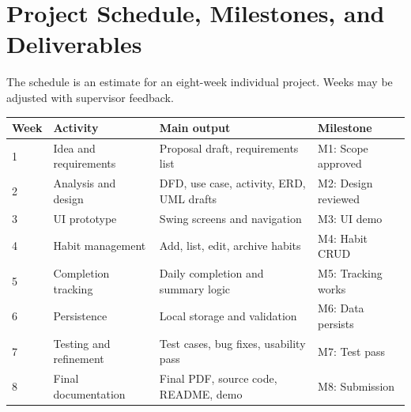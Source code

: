 \documentclass[11pt,a4paper]{article}
\begin{document}
\begin{center}
\end{center}

\section{Project Schedule, Milestones, and Deliverables}
The schedule is an estimate for an eight-week individual project. Weeks may be adjusted with supervisor feedback.
\begin{tabularx}{\linewidth}{p{1.1cm}p{2.4cm}X p{2.3cm}}
\toprule
Week & Activity & Main output & Milestone\\ \midrule
1 & Idea and requirements & Proposal draft, requirements list & M1: Scope approved\\
2 & Analysis and design & DFD, use case, activity, ERD, UML drafts & M2: Design reviewed\\
3 & UI prototype & Swing screens and navigation & M3: UI demo\\
4 & Habit management & Add, list, edit, archive habits & M4: Habit CRUD\\
5 & Completion tracking & Daily completion and summary logic & M5: Tracking works\\
6 & Persistence & Local storage and validation & M6: Data persists\\
7 & Testing and refinement & Test cases, bug fixes, usability pass & M7: Test pass\\
8 & Final documentation & Final PDF, source code, README, demo & M8: Submission\\
\bottomrule
\end{tabularx}
\end{document}
